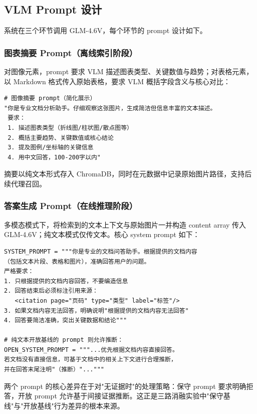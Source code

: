 ﻿\documentclass[UTF8, heading=true]{ctexart}
\begin{document}
\subsection{VLM Prompt 设计}

系统在三个环节调用 GLM-4.6V，每个环节的 prompt 设计如下。

\subsubsection{图表摘要 Prompt（离线索引阶段）}

对图像元素，prompt 要求 VLM 描述图表类型、关键数值与趋势；对表格元素，以 Markdown 格式传入原始表格，要求 VLM 概括字段含义与核心对比：

\begin{lstlisting}[style=pythonstyle]
# 图像摘要 prompt（简化展示）
"你是专业文档分析助手。仔细观察这张图片，生成简洁但信息丰富的文本描述。
 要求：
 1. 描述图表类型（折线图/柱状图/散点图等）
 2. 概括主要趋势、关键数值或核心结论
 3. 提及图例/坐标轴的关键信息
 4. 用中文回答，100-200字以内"
\end{lstlisting}

摘要以纯文本形式存入 ChromaDB，同时在元数据中记录原始图片路径，支持后续代理召回。

\subsubsection{答案生成 Prompt（在线推理阶段）}

多模态模式下，将检索到的文本上下文与原始图片一并构造 content array 传入 GLM-4.6V；纯文本模式仅传文本。核心 system prompt 如下：

\begin{lstlisting}[style=pythonstyle]
SYSTEM_PROMPT = """你是专业的文档问答助手。根据提供的文档内容
（包括文本片段、表格和图片），准确回答用户的问题。
严格要求：
1. 只根据提供的文档内容回答，不要编造信息
2. 回答结束后必须标注引用来源：
   <citation page="页码" type="类型" label="标签"/>
3. 如果文档内容无法回答，明确说明"根据提供的文档内容无法回答"
4. 回答要简洁准确，突出关键数据和结论"""

# 纯文本开放基线的 prompt 则允许推断：
OPEN_SYSTEM_PROMPT = """...优先根据文档内容直接回答。
若文档没有直接信息，可基于文档中的相关上下文进行合理推断，
并在回答末尾注明"（推断）"..."""
\end{lstlisting}

两个 prompt 的核心差异在于对"无证据时"的处理策略：保守 prompt 要求明确拒答，开放 prompt 允许基于间接证据推断。这正是三路消融实验中"保守基线"与"开放基线"行为差异的根本来源。
\end{document}
